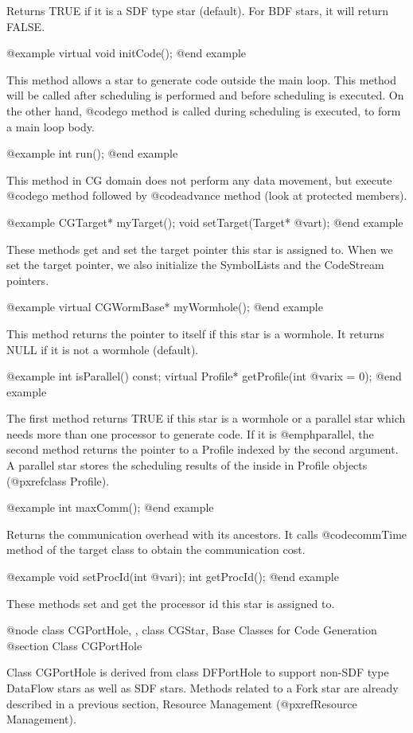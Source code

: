 Returns TRUE if it is a SDF type star (default). For BDF stars, 
it will return FALSE.

@example
virtual void initCode();
@end example

This method allows a star to generate code outside the main loop.
This method will be called after scheduling is performed and before
scheduling is executed. On the other hand, @code{go} method is called
during scheduling is executed, to form a main loop body.

@example
int run();
@end example

This method in CG domain does not perform any data movement, but
execute @code{go} method followed by @code{advance} method (look at
protected members).

@example
CGTarget* myTarget();
void setTarget(Target* @var{t});
@end example

These methods get and set the target pointer this star is assigned to.
When we set the target pointer, we also initialize the SymbolLists and
the CodeStream pointers.

@example
virtual CGWormBase* myWormhole();
@end example

This method returns the pointer to itself if this star is a wormhole. 
It returns NULL if it is not a wormhole (default).

@example
int isParallel() const;
virtual Profile* getProfile(int @var{ix} = 0);
@end example

The first method returns TRUE if this star is a wormhole or a parallel 
star which needs more than one processor to generate code. If it is
@emph{parallel}, the second method returns the pointer to a Profile
indexed by the second argument. A parallel star stores the scheduling
results of the inside in Profile objects (@pxref{class Profile}).

@example
int maxComm();
@end example

Returns the communication overhead with its ancestors. It calls
@code{commTime} method of the target class to obtain the communication
cost.

@example
void setProcId(int @var{i});
int getProcId();
@end example

These methods set and get the processor id this star is assigned to.

@node class CGPortHole, , class CGStar, Base Classes for Code Generation
@section Class CGPortHole

Class CGPortHole is derived from class DFPortHole to support non-SDF type
DataFlow stars as well as SDF stars. Methods related to a Fork star
are already described in a previous section, Resource Management
(@pxref{Resource Management}).

